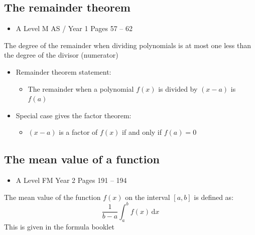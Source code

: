 \documentclass[11pt, a4paper]{article}
\begin{document}
\subsection{The remainder theorem}
\begin{itemize}
\item A Level M AS / Year 1 \hspace{1cm} \phantom{ } Pages 57 -- 62
\end{itemize} \par
The degree of the remainder when dividing polynomials is at most one less than the degree of the divisor (numerator)
\begin{itemize}
\item [] Remainder theorem statement:
\vspace{-0.35cm}
\begin{itemize}
\item The remainder when a polynomial $f(x)$ is divided by $(x-a)$ is $f(a)$
\end{itemize}
\item [] Special case gives the factor theorem:
\vspace{-0.35cm}
\begin{itemize}
\item $(x-a)$ is a factor of $f(x)$ if and only if $f(a)=0$
\end{itemize}
\end{itemize}
\vspace{0.5cm}
\newpage

\subsection{The mean value of a function}
\begin{itemize}
\item A Level FM Year 2 \hspace{1cm} \phantom{AS /} Pages 191 -- 194
\end{itemize}
The mean value of the function $f(x)$ on the interval $[a,b]$ is defined as:
\begin{equation*}
\frac{1}{b-a}\int_{a}^{b}f(x)\,\mathrm{d}x
\end{equation*}
This is given in the formula booklet
\vspace{0.3cm}
\end{document}
